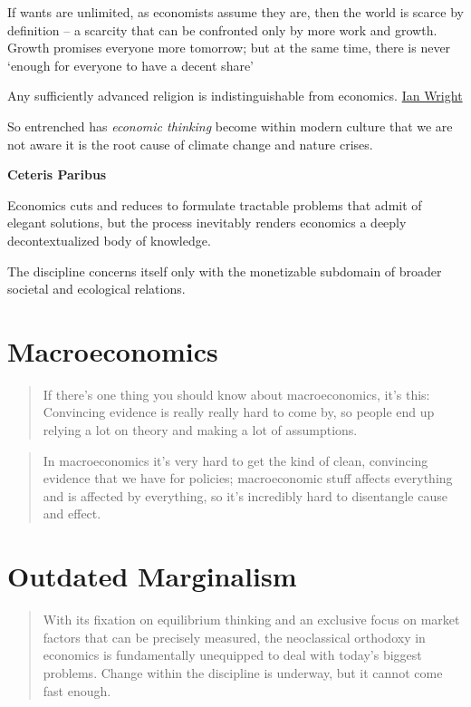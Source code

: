 \documentclass[
]{book}
\begin{document}
If wants are unlimited, as economists assume they are, then the world is scarce by definition -- a scarcity that can be confronted only by more work and growth. Growth promises everyone more tomorrow; but at the same time, there is never `enough for everyone to have a decent share'

Any sufficiently advanced religion is indistinguishable from economics.
\href{https://ianwrightsite.wordpress.com/2021/11/25/dark-eucharist-of-the-real-god/}{Ian Wright}

So entrenched has \emph{economic thinking} become within modern culture that we are not aware it is the root cause of climate change and nature crises.

\textbf{Ceteris Paribus}

Economics cuts and reduces to formulate tractable problems that admit of elegant solutions, but the process inevitably renders economics a deeply decontextualized body of knowledge.

The discipline concerns itself only with the monetizable subdomain of broader societal and ecological relations.

\hypertarget{macroeconomics}{%
\section{Macroeconomics}\label{macroeconomics}}

\begin{quote}
If there's one thing you should know about macroeconomics, it's this:
Convincing evidence is really really hard to come by,
so people end up relying a lot on theory and
making a lot of assumptions.
\end{quote}

\begin{quote}
In macroeconomics it's very hard to get the kind of clean,
convincing evidence that we have for policies;
macroeconomic stuff affects everything and is affected by everything,
so it's incredibly hard to disentangle cause and effect.
\end{quote}

\hypertarget{outdated-marginalism}{%
\section{Outdated Marginalism}\label{outdated-marginalism}}

\begin{quote}
With its fixation on equilibrium thinking and an exclusive focus on market factors that can be precisely measured, the neoclassical orthodoxy in economics is fundamentally unequipped to deal with today's biggest problems. Change within the discipline is underway, but it cannot come fast enough.
\end{quote}
\end{document}
